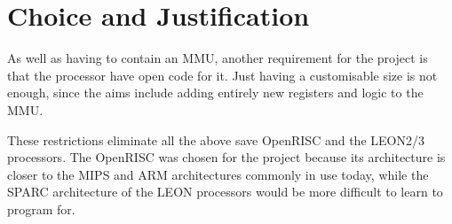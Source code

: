 \section{Choice and Justification}
As well as having to contain an MMU, another requirement for the project is that the processor have open code for it. Just having a customisable size is not enough, since the aims include adding entirely new registers and logic to the MMU.

These restrictions eliminate all the above save OpenRISC and the LEON2/3 processors. The OpenRISC was chosen for the project because its architecture is closer to the MIPS and ARM architectures commonly in use today, while the SPARC architecture of the LEON processors would be more difficult to learn to program for.